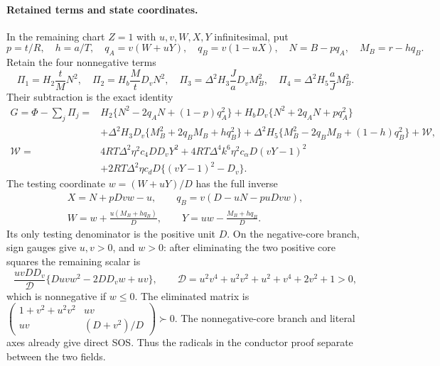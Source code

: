 \paragraph{Retained terms and state coordinates.}
In the remaining chart $Z=1$ with $u,v,W,X,Y$ infinitesimal, put
\[
 p=t/R,\quad h=a/T,\quad q_A=v(W+uY),\quad q_B=v(1-uX),
 \quad N=B-pq_A,\quad M_B=r-hq_B.
\]
Retain the four nonnegative terms
\[
 \Pi_1=H_2\frac tM N^2,\quad
 \Pi_2=H_b\frac MtD_vN^2,\quad
 \Pi_3=\Delta^2H_3\frac JaD_vM_B^2,\quad
 \Pi_4=\Delta^2H_5\frac aJM_B^2.                         \tag{SD3}
\]
Their subtraction is the exact identity
\begin{align*}
G=\Phi-\sum_j\Pi_j={}&H_2\{N^2-2q_AN+(1-p)q_A^2\}
 +H_bD_v\{N^2+2q_AN+pq_A^2\}\\
 &+\Delta^2H_3D_v\{M_B^2+2q_BM_B+hq_B^2\}
 +\Delta^2H_5\{M_B^2-2q_BM_B+(1-h)q_B^2\}
 +\mathcal W,\\
\mathcal W={}&4RT\Delta^2\eta^2c_4DD_vY^2
 +4RT\Delta^4k^6\eta^2c_\alpha D(vY-1)^2\\
 &+2RT\Delta^2\eta c_dD\{(vY-1)^2-D_v\}.
                                                               \tag{SD4}
\end{align*}
The testing coordinate $w=(W+uY)/D$ has the full inverse
\[
\begin{gathered}
 X=N+pDvw-u,\qquad q_B=v(D-uN-puDvw),\\
 W=w+\frac{u(M_B+hq_B)}D,\qquad
 Y=uw-\frac{M_B+hq_B}D.
\end{gathered}                                \tag{SD5}
\]
Its only testing denominator is the positive unit $D$.
On the negative-core branch, sign gauges give $u,v>0$, and $w>0$:
after eliminating the two positive core squares the remaining scalar is
\[
 \frac{uvDD_v}{\mathcal D}\{Duv w^2-2DD_vw+uv\},\qquad
 \mathcal D=u^2v^4+u^2v^2+u^2+v^4+2v^2+1>0,
\]
which is nonnegative if $w\le0$. The eliminated matrix is
$\left(\begin{smallmatrix}1+v^2+u^2v^2&uv\\uv&(D+v^2)/D\end{smallmatrix}\right)\succ0$.
The nonnegative-core branch and literal axes already give direct SOS.
Thus the radicals in the conductor proof separate between the two fields.

